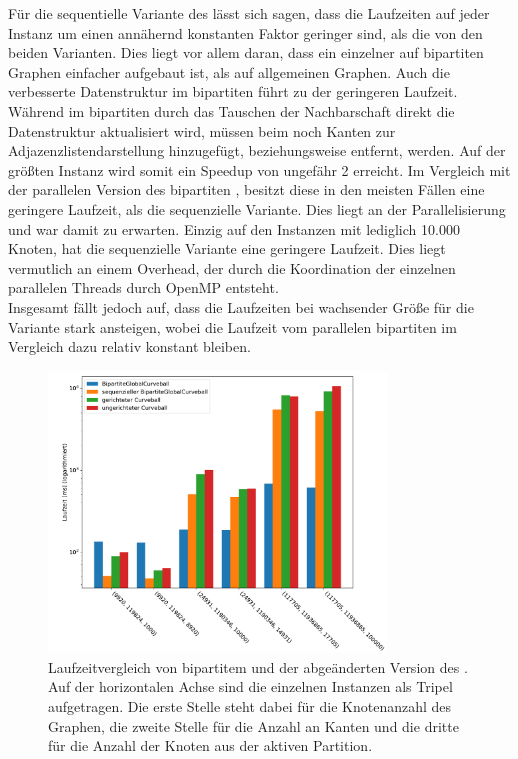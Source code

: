 Für die sequentielle Variante des \gc{} lässt sich sagen, dass die Laufzeiten auf jeder Instanz um
einen annähernd konstanten Faktor geringer sind, als die von den beiden \cb{} Varianten. 
Dies liegt vor allem daran, 
dass ein einzelner \ct{} auf bipartiten Graphen einfacher aufgebaut ist, als auf allgemeinen Graphen.
Auch die verbesserte Datenstruktur im bipartiten \gc{} führt zu der geringeren Laufzeit.
Während im bipartiten \gc{} durch das Tauschen der Nachbarschaft direkt die Datenstruktur
aktualisiert wird, müssen beim \cb{} noch Kanten zur Adjazenzlistendarstellung hinzugefügt, 
beziehungsweise entfernt, werden.
Auf der größten Instanz wird somit ein Speedup von ungefähr 2 erreicht.
Im Vergleich mit der parallelen Version des bipartiten \gc{}, besitzt diese in den meisten Fällen
eine geringere Laufzeit, als die sequenzielle Variante. Dies liegt an der Parallelisierung und
war damit zu erwarten. Einzig auf den Instanzen mit lediglich 10.000 Knoten, hat die sequenzielle
Variante eine geringere Laufzeit. Dies liegt vermutlich an einem Overhead, der durch die Koordination
der einzelnen parallelen Threads durch OpenMP entsteht.
\\

Insgesamt fällt jedoch auf, dass die Laufzeiten bei wachsender Größe für die \cb{}
Variante stark ansteigen, wobei die Laufzeit vom parallelen bipartiten \gc{} im Vergleich dazu
relativ konstant bleiben.
\begin{figure}
\centering
	\includegraphics[width = 0.8\textwidth]{figures/speedup.pdf}
	\caption[Laufzeitvergleich von bipartitem \gc{} und einer abgeänderten Variante von \cb{}]{Laufzeitvergleich von bipartitem \gc{} und der abgeänderten Version des .{}
	Auf der horizontalen Achse sind die einzelnen Instanzen als Tripel aufgetragen.
Die erste Stelle steht dabei für die Knotenanzahl des Graphen, 
die zweite Stelle für die Anzahl an Kanten und die dritte für die Anzahl der Knoten aus 
der aktiven Partition.}
	\label{fig:speedup_komplett}
\end{figure}
